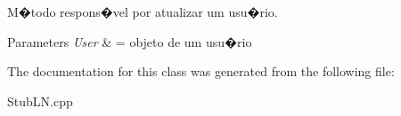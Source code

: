 M�todo respons�vel por atualizar um usu�rio. 


\begin{DoxyParams}{Parameters}
{\em User} & = objeto de um usu�rio \\
\hline
\end{DoxyParams}


The documentation for this class was generated from the following file\-:\begin{DoxyCompactItemize}
\item 
Stub\-L\-N.\-cpp\end{DoxyCompactItemize}

